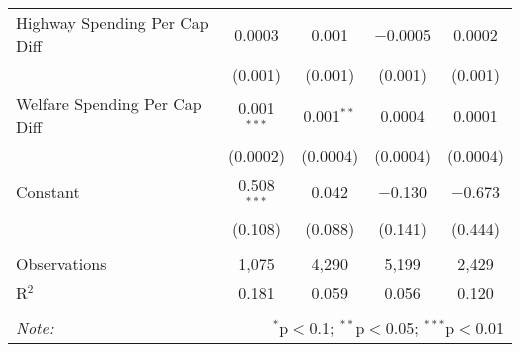 \begin{table}[!htbp]
\begin{tabular}{@{\extracolsep{5pt}}lcccc}
  Highway Spending Per Cap Diff & 0.0003 & 0.001 & $-$0.0005 & 0.0002 \\ 
  & (0.001) & (0.001) & (0.001) & (0.001) \\ 
  Welfare Spending Per Cap Diff & 0.001$^{***}$ & 0.001$^{**}$ & 0.0004 & 0.0001 \\ 
  & (0.0002) & (0.0004) & (0.0004) & (0.0004) \\ 
  Constant & 0.508$^{***}$ & 0.042 & $-$0.130 & $-$0.673 \\ 
  & (0.108) & (0.088) & (0.141) & (0.444) \\ 
 \hline \\[-1.8ex] 
Observations & 1,075 & 4,290 & 5,199 & 2,429 \\ 
R$^{2}$ & 0.181 & 0.059 & 0.056 & 0.120 \\ 
\hline 
\hline \\[-1.8ex] 
\textit{Note:}  & \multicolumn{4}{r}{$^{*}$p$<$0.1; $^{**}$p$<$0.05; $^{***}$p$<$0.01} \\ 
\end{tabular} 
\end{table} 
